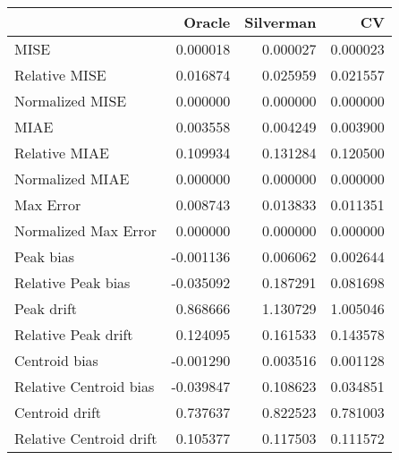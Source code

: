 \begin{tabular}{lrrr}
  \hline
 & Oracle & Silverman & CV \\ 
  \hline
MISE & 0.000018 & 0.000027 & 0.000023 \\ 
  Relative MISE & 0.016874 & 0.025959 & 0.021557 \\ 
  Normalized MISE & 0.000000 & 0.000000 & 0.000000 \\ 
  MIAE & 0.003558 & 0.004249 & 0.003900 \\ 
  Relative MIAE & 0.109934 & 0.131284 & 0.120500 \\ 
  Normalized MIAE & 0.000000 & 0.000000 & 0.000000 \\ 
  Max Error & 0.008743 & 0.013833 & 0.011351 \\ 
  Normalized Max Error & 0.000000 & 0.000000 & 0.000000 \\ 
  Peak bias & -0.001136 & 0.006062 & 0.002644 \\ 
  Relative Peak bias & -0.035092 & 0.187291 & 0.081698 \\ 
  Peak drift & 0.868666 & 1.130729 & 1.005046 \\ 
  Relative Peak drift & 0.124095 & 0.161533 & 0.143578 \\ 
  Centroid bias & -0.001290 & 0.003516 & 0.001128 \\ 
  Relative Centroid bias & -0.039847 & 0.108623 & 0.034851 \\ 
  Centroid drift & 0.737637 & 0.822523 & 0.781003 \\ 
  Relative Centroid drift & 0.105377 & 0.117503 & 0.111572 \\ 
   \hline
\end{tabular}
